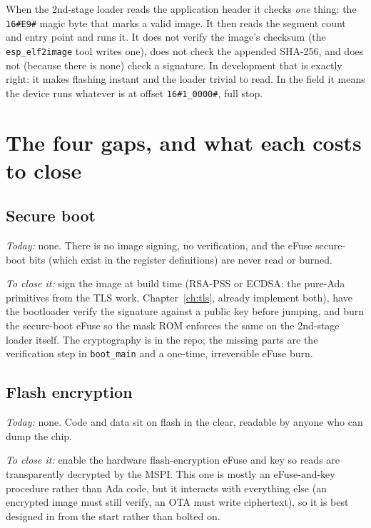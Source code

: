 When the 2nd-stage loader reads the application header it checks \emph{one} thing:
the \texttt{16\#E9\#} magic byte that marks a valid image. It then reads the segment
count and entry point and runs it. It does not verify the image's checksum (the
\texttt{esp\_elf2image} tool writes one), does not check the appended SHA-256, and
does not (because there is none) check a signature. In development that is
exactly right: it makes flashing instant and the loader trivial to read. In the
field it means the device runs whatever is at offset \texttt{16\#1\_0000\#}, full
stop.

\section{The four gaps, and what each costs to close}

\subsection{Secure boot}

\emph{Today:} none. There is no image signing, no verification, and the eFuse
secure-boot bits (which exist in the register definitions) are never read or
burned.

\emph{To close it:} sign the image at build time (RSA-PSS or ECDSA: the pure-Ada
primitives from the TLS work, Chapter~\ref{ch:tls}, already implement both), have
the bootloader verify the signature against a public key before jumping, and burn
the secure-boot eFuse so the mask ROM enforces the same on the 2nd-stage loader
itself. The cryptography is in the repo; the missing parts are the verification step
in \texttt{boot\_main} and a one-time, irreversible eFuse burn.

\subsection{Flash encryption}

\emph{Today:} none. Code and data sit on flash in the clear, readable by anyone
who can dump the chip.

\emph{To close it:} enable the hardware flash-encryption eFuse and key so reads are
transparently decrypted by the MSPI. This one is mostly an eFuse-and-key procedure
rather than Ada code, but it interacts with everything else (an encrypted image must
still verify, an OTA must write ciphertext), so it is best designed in from the
start rather than bolted on.

